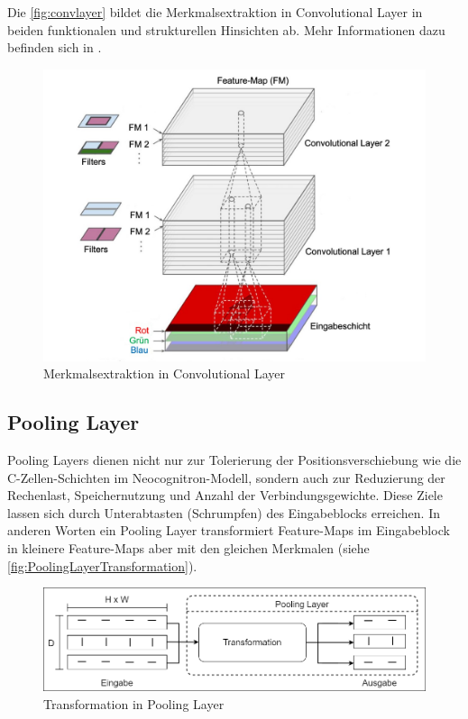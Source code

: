 Die \autoref{fig:convlayer} bildet die Merkmalsextraktion in Convolutional Layer in beiden funktionalen und strukturellen Hinsichten ab. Mehr Informationen dazu befinden sich in \cite{10.5555/3378999}.

\begin{figure}[h]
		\centering
		\includegraphics[width=\linewidth]{images/convolutionalLayer}
		\caption{Merkmalsextraktion in Convolutional Layer  \protect\cite{convlayer}}
		\label{fig:convlayer}
\end{figure}
	

\subsection{Pooling Layer}
	
Pooling Layers dienen nicht nur zur Tolerierung der Positionsverschiebung wie die C-Zellen-Schichten im Neocognitron-Modell, sondern auch zur Reduzierung der Rechenlast, Speichernutzung und Anzahl der Verbindungsgewichte. Diese Ziele lassen sich durch Unterabtasten (Schrumpfen) des Eingabeblocks erreichen. In anderen Worten ein Pooling Layer transformiert Feature-Maps im Eingabeblock in kleinere Feature-Maps aber mit den gleichen Merkmalen (siehe \autoref{fig:PoolingLayerTransformation}).
	
\begin{figure}[!hb]
	\centering
	\includegraphics[width=\linewidth]{images/PoolingLayerTransformation}
	\caption{Transformation in Pooling Layer}
	\label{fig:PoolingLayerTransformation}
\end{figure}

